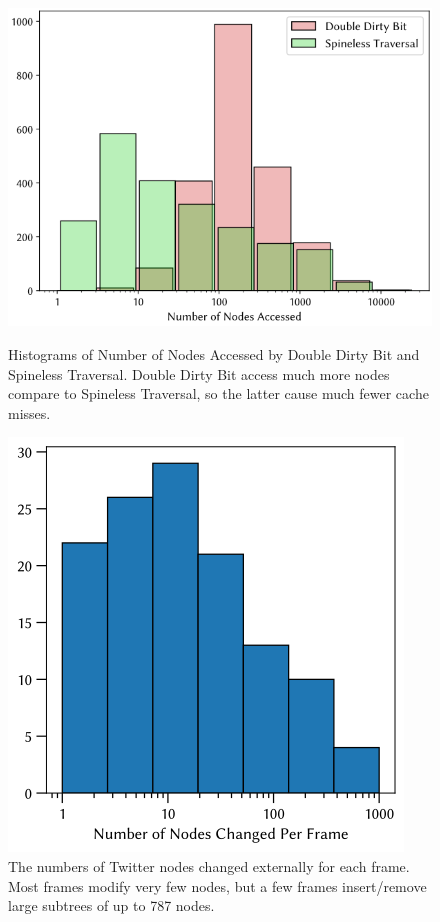 \begin{figure}
\begin{minipage}{.59\linewidth}%
\includegraphics[width=\linewidth]{DBPQHist.png}%
\caption{Histograms of Number of Nodes Accessed by Double Dirty Bit and Spineless Traversal. Double Dirty Bit access much more nodes compare to Spineless Traversal, so the latter cause much fewer cache misses.}
\label{fig:nodes-accessed}
\end{minipage}\hfill%
\begin{minipage}{.39\linewidth}%
\includegraphics[width=\linewidth]{CaseStudy.png}
\caption{The numbers of Twitter nodes changed externally for each frame. Most frames modify very few nodes, but a few frames insert/remove large subtrees of up to 787 nodes.}
\label{fig:case-study}
\end{minipage}
\end{figure}

